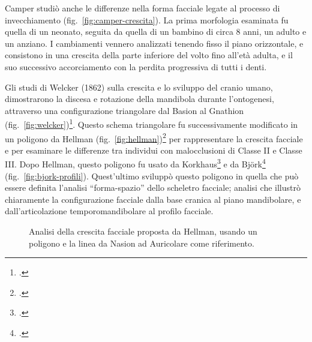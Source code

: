 Camper studiò anche le differenze nella forma facciale legate al processo di invecchiamento (fig.~\vref{fig:camper-crescita}). La prima morfologia esaminata fu quella di un neonato, seguita da quella di un bambino di circa 8 anni, un adulto e un anziano. I cambiamenti vennero analizzati tenendo fisso il piano orizzontale, e consistono in una crescita della parte inferiore del volto fino all'età adulta, e il suo successivo accorciamento con la perdita progressiva di tutti i denti.

Gli studi di Welcker (1862) sulla crescita e lo sviluppo del cranio umano, dimostrarono la discesa e rotazione della mandibola durante l'ontogenesi, attraverso una configurazione triangolare dal Basion al Gnathion (fig.~\vref{fig:welcker})\footcite{Welcker1866}. Questo schema triangolare fu successivamente modificato in un poligono da Hellman (fig.~\vref{fig:hellman})\footcite{Hellman1935} per rappresentare la crescita facciale e per esaminare le differenze tra individui con malocclusioni di Classe II e Classe III. Dopo Hellman, questo poligono fu usato da Korkhaus\footcite{Korkhaus1939} e da Björk\footcite{Bjoerk1947} (fig.~\vref{fig:bjork-profili}). Quest'ultimo sviluppò questo poligono in quella che può essere definita l'analisi ``forma-spazio'' dello scheletro facciale; analisi che illustrò chiaramente la configurazione facciale dalla base cranica al piano mandibolare, e dall'articolazione temporomandibolare al profilo facciale.

\begin{figure}
\centering
{}
\caption{Analisi della crescita facciale proposta da Hellman, usando un poligono e la linea da Nasion ad Auricolare come riferimento.}
\label{fig:hellman}
\end{figure}

